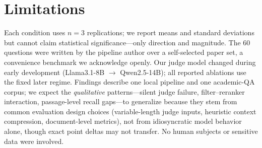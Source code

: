 \documentclass[11pt]{article}
\begin{document}
\section*{Limitations}
\label{sec:limitations}

Each condition uses $n{=}3$ replications; we report means and standard deviations but cannot claim statistical significance---only direction and magnitude.
The 60 questions were written by the pipeline author over a self-selected paper set, a convenience benchmark we acknowledge openly.
Our judge model changed during early development (Llama3.1-8B $\rightarrow$ Qwen2.5-14B); all reported ablations use the fixed later regime.
Findings describe one local pipeline and one academic-QA corpus; we expect the \emph{qualitative} patterns---silent judge failure, filter--reranker interaction, passage-level recall gaps---to generalize because they stem from common evaluation design choices (variable-length judge inputs, heuristic context compression, document-level metrics), not from idiosyncratic model behavior alone, though exact point deltas may not transfer.
No human subjects or sensitive data were involved.


\end{document}
